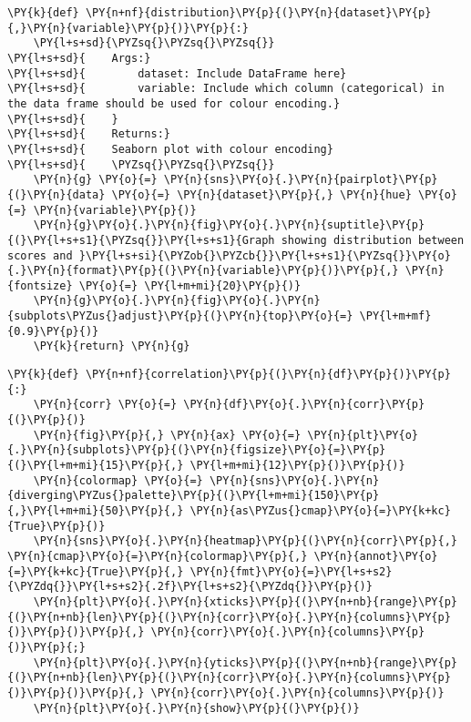     \begin{tcolorbox}[breakable, size=fbox, boxrule=1pt, pad at break*=1mm,colback=cellbackground, colframe=cellborder]
\begin{Verbatim}[commandchars=\\\{\}]
\PY{k}{def} \PY{n+nf}{distribution}\PY{p}{(}\PY{n}{dataset}\PY{p}{,}\PY{n}{variable}\PY{p}{)}\PY{p}{:}
    \PY{l+s+sd}{\PYZsq{}\PYZsq{}\PYZsq{}}
\PY{l+s+sd}{    Args:}
\PY{l+s+sd}{        dataset: Include DataFrame here}
\PY{l+s+sd}{        variable: Include which column (categorical) in the data frame should be used for colour encoding.}
\PY{l+s+sd}{    }
\PY{l+s+sd}{    Returns:}
\PY{l+s+sd}{    Seaborn plot with colour encoding}
\PY{l+s+sd}{    \PYZsq{}\PYZsq{}\PYZsq{}}
    \PY{n}{g} \PY{o}{=} \PY{n}{sns}\PY{o}{.}\PY{n}{pairplot}\PY{p}{(}\PY{n}{data} \PY{o}{=} \PY{n}{dataset}\PY{p}{,} \PY{n}{hue} \PY{o}{=} \PY{n}{variable}\PY{p}{)}
    \PY{n}{g}\PY{o}{.}\PY{n}{fig}\PY{o}{.}\PY{n}{suptitle}\PY{p}{(}\PY{l+s+s1}{\PYZsq{}}\PY{l+s+s1}{Graph showing distribution between scores and }\PY{l+s+si}{\PYZob{}\PYZcb{}}\PY{l+s+s1}{\PYZsq{}}\PY{o}{.}\PY{n}{format}\PY{p}{(}\PY{n}{variable}\PY{p}{)}\PY{p}{,} \PY{n}{fontsize} \PY{o}{=} \PY{l+m+mi}{20}\PY{p}{)}
    \PY{n}{g}\PY{o}{.}\PY{n}{fig}\PY{o}{.}\PY{n}{subplots\PYZus{}adjust}\PY{p}{(}\PY{n}{top}\PY{o}{=} \PY{l+m+mf}{0.9}\PY{p}{)}
    \PY{k}{return} \PY{n}{g}
\end{Verbatim}
\end{tcolorbox}

    \begin{tcolorbox}[breakable, size=fbox, boxrule=1pt, pad at break*=1mm,colback=cellbackground, colframe=cellborder]
\begin{Verbatim}[commandchars=\\\{\}]
\PY{k}{def} \PY{n+nf}{correlation}\PY{p}{(}\PY{n}{df}\PY{p}{)}\PY{p}{:}
    \PY{n}{corr} \PY{o}{=} \PY{n}{df}\PY{o}{.}\PY{n}{corr}\PY{p}{(}\PY{p}{)}
    \PY{n}{fig}\PY{p}{,} \PY{n}{ax} \PY{o}{=} \PY{n}{plt}\PY{o}{.}\PY{n}{subplots}\PY{p}{(}\PY{n}{figsize}\PY{o}{=}\PY{p}{(}\PY{l+m+mi}{15}\PY{p}{,} \PY{l+m+mi}{12}\PY{p}{)}\PY{p}{)}
    \PY{n}{colormap} \PY{o}{=} \PY{n}{sns}\PY{o}{.}\PY{n}{diverging\PYZus{}palette}\PY{p}{(}\PY{l+m+mi}{150}\PY{p}{,}\PY{l+m+mi}{50}\PY{p}{,} \PY{n}{as\PYZus{}cmap}\PY{o}{=}\PY{k+kc}{True}\PY{p}{)}
    \PY{n}{sns}\PY{o}{.}\PY{n}{heatmap}\PY{p}{(}\PY{n}{corr}\PY{p}{,} \PY{n}{cmap}\PY{o}{=}\PY{n}{colormap}\PY{p}{,} \PY{n}{annot}\PY{o}{=}\PY{k+kc}{True}\PY{p}{,} \PY{n}{fmt}\PY{o}{=}\PY{l+s+s2}{\PYZdq{}}\PY{l+s+s2}{.2f}\PY{l+s+s2}{\PYZdq{}}\PY{p}{)}
    \PY{n}{plt}\PY{o}{.}\PY{n}{xticks}\PY{p}{(}\PY{n+nb}{range}\PY{p}{(}\PY{n+nb}{len}\PY{p}{(}\PY{n}{corr}\PY{o}{.}\PY{n}{columns}\PY{p}{)}\PY{p}{)}\PY{p}{,} \PY{n}{corr}\PY{o}{.}\PY{n}{columns}\PY{p}{)}\PY{p}{;}
    \PY{n}{plt}\PY{o}{.}\PY{n}{yticks}\PY{p}{(}\PY{n+nb}{range}\PY{p}{(}\PY{n+nb}{len}\PY{p}{(}\PY{n}{corr}\PY{o}{.}\PY{n}{columns}\PY{p}{)}\PY{p}{)}\PY{p}{,} \PY{n}{corr}\PY{o}{.}\PY{n}{columns}\PY{p}{)}
    \PY{n}{plt}\PY{o}{.}\PY{n}{show}\PY{p}{(}\PY{p}{)}
\end{Verbatim}
\end{tcolorbox}

